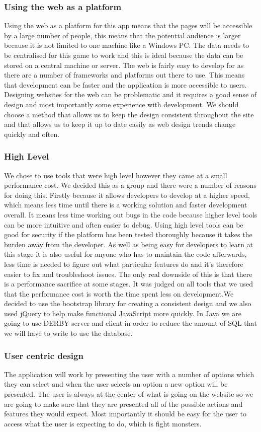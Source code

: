 \documentclass[titlepage]{article}
\begin{document}
\subsubsection{Using the web as a platform}
Using the web as a platform for this app means that the pages will be accessible by a large number of people, this means that the potential audience is larger because it is not limited to one machine like a Windows PC. The data needs to be centralised for this game to work and this is ideal because the data can be stored on a central machine or server. The web is fairly easy to develop for as there are a number of frameworks and platforms out there to use. This means that development can be faster and the application is more accessible to users. Designing websites for the web can be problematic and it requires a good sense of design and most importantly some experience with development. We should choose a method that allows us to keep the design consistent throughout the site and that allows us to keep it up to date easily as web design trends change quickly and often.
\subsubsection{High Level}
We chose to use tools that were high level however they came at a small performance cost. We decided this as a group and there were a number of reasons for doing this. Firstly because it allows developers to develop at a higher speed, which means less time until there is a working solution and faster development overall. It means less time working out bugs in the code because higher level tools can be more intuitive and often easier to debug. Using high level tools can be good for security if the platform has been tested thoroughly because it takes the burden away from the developer. As well as being easy for developers to learn at this stage it is also useful for anyone who has to maintain the code afterwards, less time is needed to figure out what particular features do and it's therefore easier to fix and troubleshoot issues. The only real downside of this is that there is a performance sacrifice at some stages. It was judged on all tools that we used that the performance cost is worth the time spent less on development.We decided to use the bootstrap library for creating a consistent design and we also used jQuery to help make functional JavaScript more quickly. In Java we are going to use DERBY server and client in order to reduce the amount of SQL that we will have to write to use the database.
\subsubsection{User centric design}
The application will work by presenting the user with a number of options which they can select and when the user selects an option a new option will be presented. The user is always at the center of what is going on the website so we are going to make sure that they are presented all of the possible actions and features they would expect. Most importantly it should be easy for the user to access what the user is expecting to do, which is fight monsters.
\end{document}

